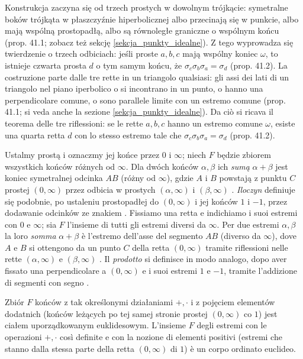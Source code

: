 Konstrukcja zaczyna się od trzech prostych w dowolnym trójkącie: symetralne boków trójkąta w płaszczyźnie hiperbolicznej albo przecinają się w punkcie, albo mają wspólną prostopadłą, albo są równoległe graniczne o wspólnym końcu \cite[s. 388--389]{hartshorne_2000} (prop. 41.1; zobacz też sekcję \ref{sekcja_punkty_idealne}). %
Z tego wyprowadza się twierdzenie o trzech odbiciach: jeśli proste $a, b, c$ mają wspólny koniec $\omega$, to istnieje czwarta prosta $d$ o tym samym końcu, że $\sigma_c\sigma_b\sigma_a = \sigma_d$ \cite[s. 389]{hartshorne_2000} (prop. 41.2). %
La costruzione parte dalle tre rette in un triangolo qualsiasi: gli assi dei lati di un triangolo nel piano iperbolico o si incontrano in un punto, o hanno una perpendicolare comune, o sono parallele limite con un estremo comune \cite[p. 388--389]{hartshorne_2000} (prop. 41.1; si veda anche la sezione \ref{sekcja_punkty_idealne}). %
Da ciò si ricava il teorema delle tre riflessioni: se le rette $a, b, c$ hanno un estremo comune $\omega$, esiste una quarta retta $d$ con lo stesso estremo tale che $\sigma_c\sigma_b\sigma_a = \sigma_d$ \cite[p. 389]{hartshorne_2000} (prop. 41.2). %

Ustalmy prostą i oznaczmy jej końce przez $0$ i $\infty$; niech $F$ będzie zbiorem wszystkich końców różnych od $\infty$. %
Dla dwóch końców $\alpha, \beta$ ich \emph{sumą} $\alpha + \beta$ jest koniec symetralnej odcinka $AB$ (różny od $\infty$), gdzie $A$ i $B$ powstają z punktu $C$ prostej $(0,\infty)$ przez odbicia w prostych $(\alpha,\infty)$ i $(\beta,\infty)$ \cite[s. 390]{hartshorne_2000}. %
\emph{Iloczyn} definiuje się podobnie, po ustaleniu prostopadłej do $(0,\infty)$ i jej końców $1$ i $-1$, przez dodawanie odcinków ze znakiem \cite[s. 391]{hartshorne_2000}. %
Fissiamo una retta e indichiamo i suoi estremi con $0$ e $\infty$; sia $F$ l'insieme di tutti gli estremi diversi da $\infty$. %
Per due estremi $\alpha, \beta$ la loro \emph{somma} $\alpha + \beta$ è l'estremo dell'asse del segmento $AB$ (diverso da $\infty$), dove $A$ e $B$ si ottengono da un punto $C$ della retta $(0,\infty)$ tramite riflessioni nelle rette $(\alpha,\infty)$ e $(\beta,\infty)$ \cite[p. 390]{hartshorne_2000}. %
Il \emph{prodotto} si definisce in modo analogo, dopo aver fissato una perpendicolare a $(0,\infty)$ e i suoi estremi $1$ e $-1$, tramite l'addizione di segmenti con segno \cite[p. 391]{hartshorne_2000}. %

\begin{theorem}
	Zbiór $F$ końców z tak określonymi działaniami $+, \cdot$ i z pojęciem elementów dodatnich (końców leżących po tej samej stronie prostej $(0,\infty)$ co $1$) jest ciałem uporządkowanym euklidesowym. %
	L'insieme $F$ degli estremi con le operazioni $+, \cdot$ così definite e con la nozione di elementi positivi (estremi che stanno dalla stessa parte della retta $(0,\infty)$ di $1$) è un corpo ordinato euclideo. %
\end{theorem}

